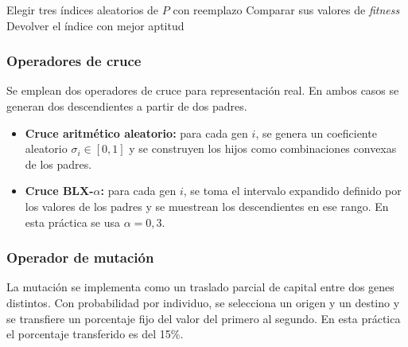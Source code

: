 \begin{algorithm}[H]
\SetAlgoLined
{}

Elegir tres índices aleatorios de $P$ con reemplazo\;
Comparar sus valores de \textit{fitness}\;
Devolver el índice con mejor aptitud\;
\caption{Torneo de tamaño 3}
\end{algorithm}

\subsubsection{Operadores de cruce}
Se emplean dos operadores de cruce para representación real. En ambos casos se generan dos descendientes a partir de dos padres.

\begin{itemize}
    \item \textbf{Cruce aritmético aleatorio:} para cada gen $i$, se genera un coeficiente aleatorio $\sigma_i \in [0,1]$ y se construyen los hijos como combinaciones convexas de los padres.
    \item \textbf{Cruce BLX-$\alpha$:} para cada gen $i$, se toma el intervalo expandido definido por los valores de los padres y se muestrean los descendientes en ese rango. En esta práctica se usa $\alpha = 0{,}3$.
\end{itemize}

\begin{algorithm}[H]
\SetAlgoLined
{}

\caption{Cruce aritmético}
\end{algorithm}

\begin{algorithm}[H]
\SetAlgoLined
{}

\caption{Cruce BLX-$\alpha$}
\end{algorithm}

\subsubsection{Operador de mutación}
La mutación se implementa como un traslado parcial de capital entre dos genes distintos. Con probabilidad por individuo, se selecciona un origen y un destino y se transfiere un porcentaje fijo del valor del primero al segundo. En esta práctica el porcentaje transferido es del 15\%.

